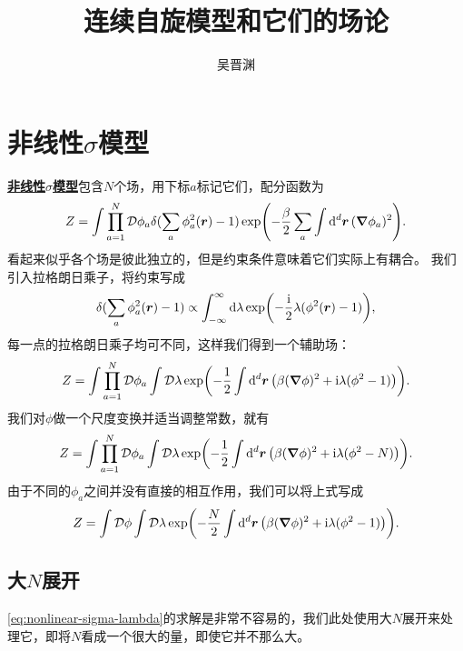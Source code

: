 \documentclass[hyperref, UTF8, a4paper]{ctexart}
\title{连续自旋模型和它们的场论}
\author{吴晋渊}
\newcommand*{\ii}{\mathrm{i}}
\newcommand*{\fd}[1]{\mathop{}\!\mathcal{D} #1}
\newcommand*{\concept}[1]{\underline{\textbf{#1}}}
\begin{document}
\maketitle

\section{非线性$\sigma$模型}

\concept{非线性$\sigma$模型}包含$N$个场，用下标$a$标记它们，配分函数为
\begin{equation}
    Z = \int \prod_{a=1}^N \fd{\phi_a} \delta(\sum_a \phi_a^2(\vb*{r}) - 1) \exp(- \frac{\beta}{2} \sum_a \int \dd[d]{\vb*{r}} (\grad{\phi_a})^2 ).
\end{equation}
看起来似乎各个场是彼此独立的，但是约束条件意味着它们实际上有耦合。
我们引入拉格朗日乘子，将约束写成
\[
    \delta(\sum_a \phi_a^2(\vb*{r}) - 1) \propto \int_{-\infty}^\infty \dd{\lambda} \exp(- \frac{\ii}{2} \lambda (\phi^2(\vb*{r}) - 1 )),
\]
每一点的拉格朗日乘子均可不同，这样我们得到一个辅助场：
\[
    Z = \int \prod_{a=1}^N \fd{\phi_a} \int \fd{\lambda} \exp(- \frac{1}{2} \int \dd[d]{\vb*{r}} \left( \beta (\grad{\phi})^2 + \ii \lambda (\phi^2 - 1) \right) ).
\]
我们对$\phi$做一个尺度变换并适当调整常数，就有
\[
    Z = \int \prod_{a=1}^N \fd{\phi_a} \int \fd{\lambda} \exp(- \frac{1}{2} \int \dd[d]{\vb*{r}} \left( \beta (\grad{\phi})^2 + \ii \lambda (\phi^2 - N) \right) ).
\]
由于不同的$\phi_a$之间并没有直接的相互作用，我们可以将上式写成
\begin{equation}
    Z = \int \fd{\phi} \int \fd{\lambda} \exp(- \frac{N}{2} \int \dd[d]{\vb*{r}} \left( \beta (\grad{\phi})^2 + \ii \lambda (\phi^2 - 1) \right) ).
    \label{eq:nonlinear-sigma-lambda}
\end{equation}

\subsection{大$N$展开}

\eqref{eq:nonlinear-sigma-lambda}的求解是非常不容易的，我们此处使用大$N$展开来处理它，即将$N$看成一个很大的量，即使它并不那么大。
\end{document}
